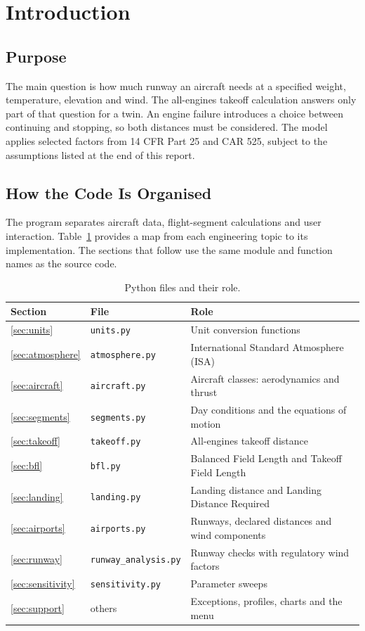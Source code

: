 \documentclass[11pt,letterpaper]{article}
\numberwithin{equation}{section}
\newcommand{\code}[1]{\textmd{\texttt{#1}}}
\begin{document}
\newpage
\tableofcontents
\listoffigures
\listoftables
\newpage
{}

\section{Introduction}
\subsection{Purpose}
The main question is how much runway an aircraft needs at a specified weight, temperature, elevation and wind. The all-engines takeoff calculation answers only part of that question for a twin. An engine failure introduces a choice between continuing and stopping, so both distances must be considered. The model applies selected factors from 14 CFR Part 25 and CAR 525, subject to the assumptions listed at the end of this report.

\subsection{How the Code Is Organised}
The program separates aircraft data, flight-segment calculations and user interaction. Table~\ref{tab:files} provides a map from each engineering topic to its implementation. The sections that follow use the same module and function names as the source code.

\begin{table}[H]
\centering
\small
\begin{tabular}{@{}lll@{}}
\toprule
\textbf{Section} & \textbf{File} & \textbf{Role}\\
\midrule
\ref{sec:units} & \code{units.py} & Unit conversion functions\\
\ref{sec:atmosphere} & \code{atmosphere.py} & International Standard Atmosphere (ISA)\\
\ref{sec:aircraft} & \code{aircraft.py} & Aircraft classes: aerodynamics and thrust\\
\ref{sec:segments} & \code{segments.py} & Day conditions and the equations of motion\\
\ref{sec:takeoff} & \code{takeoff.py} & All-engines takeoff distance\\
\ref{sec:bfl} & \code{bfl.py} & Balanced Field Length and Takeoff Field Length\\
\ref{sec:landing} & \code{landing.py} & Landing distance and Landing Distance Required\\
\ref{sec:airports} & \code{airports.py} & Runways, declared distances and wind components\\
\ref{sec:runway} & \code{runway\_analysis.py} & Runway checks with regulatory wind factors\\
\ref{sec:sensitivity} & \code{sensitivity.py} & Parameter sweeps\\
\ref{sec:support} & others & Exceptions, profiles, charts and the menu\\
\bottomrule
\end{tabular}
\caption{Python files and their role.}\label{tab:files}
\end{table}
\end{document}
